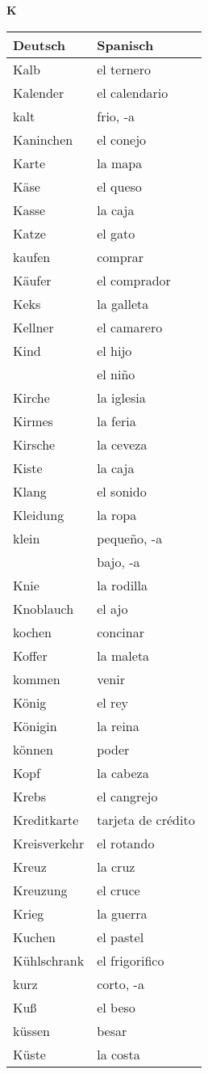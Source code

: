 \begin{flushright}\begin{Huge}\textbf{K}\end{Huge}\end{flushright}

\begin{longtable}{p{} p{}} 
\textbf{Deutsch}     & \textbf{Spanisch}                                       \\ \hline
\hline
\endhead %
Kalb & el ternero\\
Kalender & el calendario\\
kalt & frio, -a\\
Kaninchen & el conejo\\
Karte & la mapa\\
Käse & el queso\\
Kasse & la caja\\
Katze & el gato \\
kaufen & comprar\\
Käufer & el comprador\\
Keks & la galleta\\
Kellner & el camarero\\
Kind & el hijo\\
~ & el niño\\
Kirche & la iglesia\\
Kirmes & la feria\\
Kirsche & la ceveza\\
Kiste & la caja\\
Klang & el sonido\\
Kleidung & la ropa\\
klein & pequeño, -a\\
~ & bajo, -a\\
Knie & la rodilla\\
Knoblauch & el ajo\\
kochen & concinar\\
Koffer & la maleta\\
kommen & venir \\
König & el rey\\
Königin & la reina\\
können & poder\\
Kopf & la cabeza\\
Krebs & el cangrejo\\
Kreditkarte & tarjeta de crédito\\
Kreisverkehr & el rotando\\
Kreuz & la cruz\\
Kreuzung & el cruce\\
Krieg & la guerra\\
Kuchen & el pastel\\
Kühlschrank & el frigorifico\\
kurz & corto, -a\\
Kuß & el beso\\
küssen & besar\\
Küste & la costa\\
\end{longtable}
